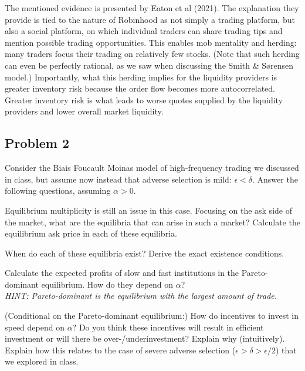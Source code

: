 \begin{solution}
	The mentioned evidence is presented by Eaton et al (2021).\footnotemark
	The explanation they provide is tied to the nature of Robinhood as not simply a trading platform, but also a social platform, on which individual traders can share trading tips and mention possible trading opportunities. This enables mob mentality and herding: many traders focus their trading on relatively few stocks. (Note that such herding can even be perfectly rational, as we saw when discussing the Smith \& S{\o}rensen model.) Importantly, what this herding implies for the liquidity providers is greater inventory risk because the order flow becomes more autocorrelated. Greater inventory risk is what leads to worse quotes supplied by the liquidity providers and lower overall market liquidity.
\end{solution}
\ifprintanswers
\fi




\quad
\subsection*{Problem 2}
	Consider the Biais Foucault Moinas model of high-frequency trading we discussed in class, but assume now instead that adverse selection is mild: $\epsilon < \delta$. Answer the following questions, assuming $\alpha > 0$.
	\begin{questions}
		\question Equilibrium multiplicity is still an issue in this case. Focusing on the ask side of the market, what are the equilibria that can arise in such a market? Calculate the equilibrium ask price in each of these equilibria.
		
		\question When do each of these equilibria exist? Derive the exact existence conditions.
		
		\question Calculate the expected profits of slow and fast institutions in the Pareto-dominant equilibrium. How do they depend on $\alpha$? 
		\\
		\emph{HINT: Pareto-dominant is the equilibrium with the largest amount of trade.}
		
		\question (Conditional on the Pareto-dominant equilibrium:) How do incentives to invest in speed depend on $\alpha$? Do you think these incentives will result in efficient investment or will there be over-/underinvestment? Explain why (intuitively). Explain how this relates to the case of severe adverse selection ($\epsilon > \delta > \epsilon/2$) that we explored in class.
	\end{questions}



